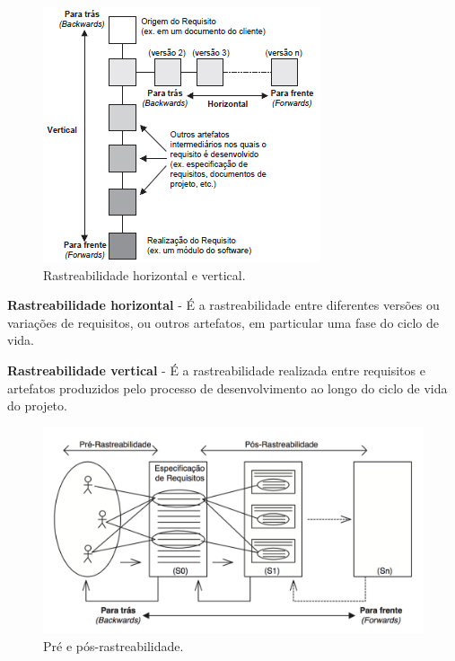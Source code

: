   \begin{figure}[!htbp]
    \centering
    \includegraphics[scale=0.75]{figuras/tipos_de_rastreabilidade}
    \caption[Rastreabilidade horizontal e vertical.]{Rastreabilidade horizontal e vertical. \footnotemark}
    \label{ramos_rastreabilidade}
  \end{figure}

\textbf{Rastreabilidade horizontal} - É a rastreabilidade entre diferentes versões ou variações de requisitos, ou outros artefatos, em particular uma fase do ciclo de vida\cite{tese_doutorado}.

\textbf{Rastreabilidade vertical} - É a rastreabilidade realizada entre requisitos e artefatos produzidos pelo processo de desenvolvimento ao longo do ciclo de vida do projeto.\cite{tese_doutorado}

  \begin{figure}[!htbp]
    \centering
    \includegraphics[scale=0.4]{figuras/pre_pos_rastreabilidade}
    \caption[Pré e pós-rastreabilidade.]{Pré e pós-rastreabilidade. \footnotemark}
    \label{pre_pos_rastreabilidade}
  \end{figure}

